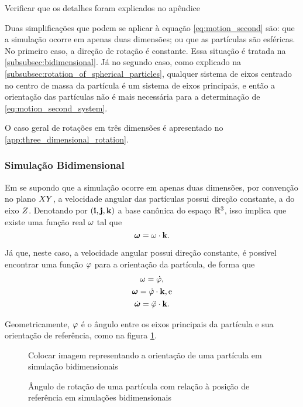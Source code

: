 \alert{Verificar que os detalhes foram explicados no apêndice}

Duas simplificações que podem se aplicar à equação \eqref{eq:motion_second} são: que a simulação ocorre em apenas duas dimensões; ou que as partículas são esféricas. No primeiro caso, a direção de rotação é constante. Essa situação é tratada na \autoref{subsubsec:bidimensional}. Já no segundo caso, como explicado na \autoref{subsubsec:rotation_of_spherical_particles}, qualquer sistema de eixos centrado no centro de massa da partícula é um sistema de eixos principais, e então a orientação das partículas não é mais necessária para a determinação de \eqref{eq:motion_second_system}.

O caso geral de rotações em três dimensões é apresentado no \autoref{app:three_dimensional_rotation}.

\subsubsection{Simulação Bidimensional} \label{subsubsec:bidimensional}

Em se supondo que a simulação ocorre em apenas duas dimensões, por convenção no plano \(XY\), a velocidade angular das partículas possui direção constante, a do eixo \(Z\). Denotando por \(\pqty{\xUnit, \yUnit, \zUnit}\) a base canônica do espaço \(\mathbb{R}^3\), isso implica que existe uma função real \(\omega\) tal que
\[
	\bm{\omega} = \omega\cdot\mathbf{k}.
\]

Já que, neste caso, a velocidade angular possui direção constante, é possível encontrar uma função \(\varphi\) para a orientação da partícula, de forma que
\begin{gather*}
	\angularVelocityScalar = \deriv{1}{\orientationScalar}, \\
	\angularVelocity = \deriv{1}{\orientationScalar}\cdot\zUnit, \text{e} \\
	\angularAcceleration = \deriv{2}{\orientationScalar}\cdot\zUnit.
\end{gather*}

Geometricamente, \(\varphi\) é o ângulo entre os eixos principais da partícula e sua orientação de referência, como na figura \ref{fig:bidimensional_simulation}.

\begin{figure}[h]
	\caption{Ângulo de rotação de uma partícula com relação à posição de referência em simulações bidimensionais}
	\begin{center}
		\alert{Colocar imagem representando a orientação de uma partícula em simulação bidimensionais}
	\end{center}
	\label{fig:bidimensional_simulation}
\end{figure}

